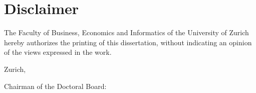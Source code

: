 \makeatletter
    \let\insertdate\@date
    \let\insertchairman\@chairman
    \newcommand{\unchapter}[1]{%
        \begingroup
        \let\@makeschapterhead\@gobble %
        \chapter*{#1}
        \endgroup
    }
\makeatother

\unchapter{Disclaimer}
\begin{singlespace}
    \noindent
    The Faculty of Business, Economics and Informatics of the University of Zurich hereby authorizes the printing of this dissertation, without indicating an opinion of the views expressed in the work.

    \vspace{1cm}
    \noindent
    Zurich, \monthdayyeardate\insertdate
    
    \vspace{0.4cm}
    \noindent
    Chairman of the Doctoral Board: \insertchairman
\end{singlespace}
